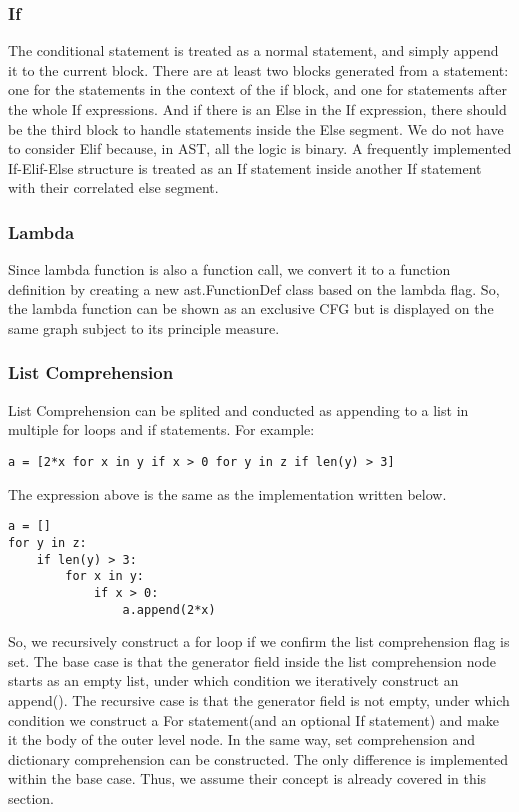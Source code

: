 \documentclass[11pt]{article}
\begin{document}
\subsubsection{If}
The conditional statement is treated as a normal statement, and simply append it to the current block. There are at least two blocks generated from a statement: one for the statements in the context of the if block, and one for statements after the whole If expressions. And if there is an Else in the If expression, there should be the third block to handle statements inside the Else segment. We do not have to consider Elif because, in AST, all the logic is binary. A frequently implemented If-Elif-Else structure is treated as an If statement inside another If statement with their correlated else segment.

\subsubsection{Lambda}
Since lambda function is also a function call, we convert it to a function definition by creating a new ast.FunctionDef class based on the lambda flag. So, the lambda function can be shown as an exclusive CFG but is displayed on the same graph subject to its principle measure.

\subsubsection{List Comprehension}
List Comprehension can be splited and conducted as appending to a list in multiple for loops and if statements. For example:
\begin{lstlisting}
a = [2*x for x in y if x > 0 for y in z if len(y) > 3]
\end{lstlisting}
The expression above is the same as the implementation written below.
\begin{lstlisting}
a = []
for y in z:
    if len(y) > 3:
        for x in y:
            if x > 0:
                a.append(2*x)
\end{lstlisting}
So, we recursively construct a for loop if we confirm the list comprehension flag is set. The base case is that the generator field inside the list comprehension node starts as an empty list, under which condition we iteratively construct an append(). The recursive case is that the generator field is not empty, under which condition we construct a For statement(and an optional If statement) and make it the body of the outer level node. In the same way, set comprehension and dictionary comprehension can be constructed. The only difference is implemented within the base case. Thus, we assume their concept is already covered in this section.
\end{document}

